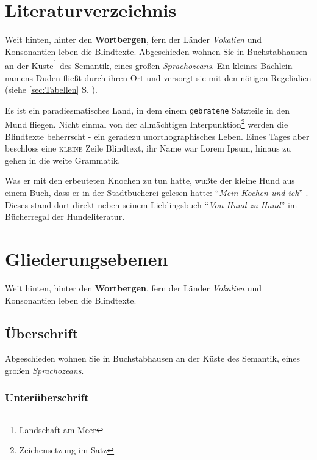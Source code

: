 \documentclass[%
	12pt,%
	a4paper,%
	oneside,%
 liststotoc, idxtotoc, bibtotoc, %
	halfparskip,%
	nochapterprefix,%
	appendixprefix, %
smallheadings,%
]{scrreprt}
\begin{document}
\chapter{Literaturverzeichnis}
\label{sec:Literaturverzeichnis}

Weit hinten, hinter den \textbf{Wortbergen}, fern der Länder \textit{Vokalien} und Konsonantien leben die Blindtexte. Abgeschieden wohnen Sie in Buchstabhausen an der Küste\footnote{Landschaft am Meer}
des Semantik, eines großen \textsl{Sprachozeans}. Ein kleines Bächlein namens Duden fließt durch ihren Ort und versorgt sie mit den nötigen Regelialien (siehe \ref{sec:Tabellen} S. \pageref{sec:Tabellen}).

Es ist ein paradiesmatisches Land, in dem einem \texttt{gebratene} Satzteile in den Mund fliegen. Nicht einmal von der allmächtigen Interpunktion\footnote{Zeichensetzung im Satz} werden die Blindtexte beherrscht - ein geradezu unorthographisches Leben. Eines Tages aber beschloss eine \textsc{kleine} Zeile Blindtext, ihr Name war Lorem Ipsum, hinaus zu gehen in die weite Grammatik. 

Was er mit den erbeuteten Knochen zu tun hatte, wußte der kleine Hund aus einem Buch, dass er in der Stadtbücherei
gelesen hatte: "`\emph{Mein Kochen und ich}"' \cite{ansorge:1999}. Dieses stand dort direkt neben seinem Lieblingsbuch
"`\emph{Von Hund zu Hund}"' \cite{balzert:SWT1} im Bücherregal der Hundeliteratur.

\chapter{Gliederungsebenen}
\label{sec:Gliederung}

Weit hinten, hinter den \textbf{Wortbergen}, fern der Länder \textit{Vokalien} und Konsonantien leben die Blindtexte.

\section{Überschrift}

Abgeschieden wohnen Sie in Buchstabhausen an der Küste des Semantik, eines großen \textsl{Sprachozeans}. 

\subsection{Unterüberschrift}
\end{document}
